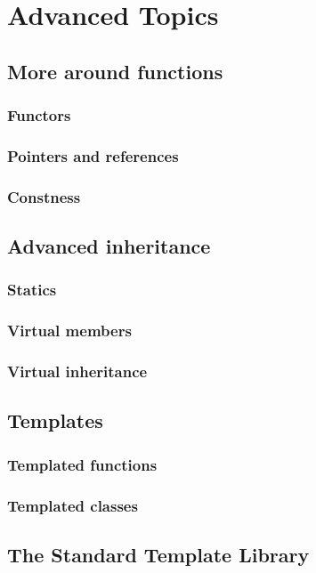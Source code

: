 \section{Advanced Topics}

\subsection[Functions]{More around functions}
\subsubsection{Functors}
\subsubsection{Pointers and references}
\subsubsection{Constness}

\subsection[Inheritance]{Advanced inheritance}
\subsubsection{Statics}
\subsubsection{Virtual members}
\subsubsection{Virtual inheritance}

\subsection{Templates}
\subsubsection[Functions]{Templated functions}
\subsubsection[Classes]{Templated classes}

\subsection[STL]{The Standard Template Library}
